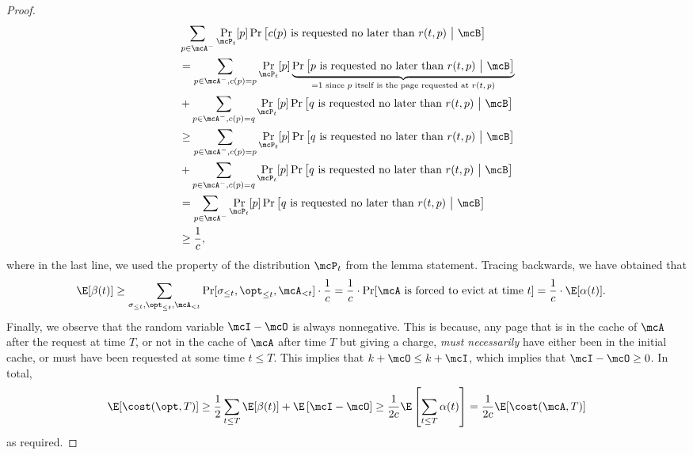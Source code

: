 \begin{proof}
    \begingroup
    \allowdisplaybreaks
    \begin{align*}
        &\sum_{p \in \mcA^-}\Pr_{\mcP_t}[p] \Pr\left[\text{$c(p)$ is requested no later than $r(t,p)$}\ \big|\ \mcB\right] \\
        &= \sum_{p \in \mcA^-, c(p)=p}\Pr_{\mcP_t}[p]\underbrace{ \Pr\left[\text{$p$ is requested no later than $r(t,p)$}\ \big|\ \mcB\right]}_{=1\text{ since $p$ itself is the page requested at $r(t,p)$}} \\
        &+ \sum_{p \in \mcA^-, c(p)=q}\Pr_{\mcP_t}[p] \Pr\left[\text{$q$ is requested no later than $r(t,p)$}\ \big|\ \mcB\right] \\
        &\ge \sum_{p \in \mcA^-, c(p)=p}\Pr_{\mcP_t}[p] \Pr\left[\text{$q$ is requested no later than $r(t,p)$}\ \big|\ \mcB\right] \\
        &+ \sum_{p \in \mcA^-, c(p)=q}\Pr_{\mcP_t}[p] \Pr\left[\text{$q$ is requested no later than $r(t,p)$}\ \big|\ \mcB\right] \\
        &= \sum_{p \in \mcA^-}\Pr_{\mcP_t}[p] \Pr\left[\text{$q$ is requested no later than $r(t,p)$}\ \big|\ \mcB\right] \\
        &\ge \frac{1}{c},
    \end{align*}%
    \endgroup
    where in the last line, we used the property of the distribution $\mcP_t$ from the lemma statement. %
    Tracing backwards, we have obtained that
    \begin{align*}
        \E[\beta(t)] &\ge \sum_{\sigma_{\le t}, \opt_{\le t}, \mcA_{<t}} \Pr[\sigma_{\le t}, \opt_{\le t}, \mcA_{<t}] \cdot \frac{1}{c} = \frac{1}{c}\cdot \Pr[\text{$\mcA$ is forced to evict at time $t$}] = \frac{1}{c} \cdot \E[\alpha(t)].
    \end{align*}
    Finally, we observe that the random variable $\mcI-\mcO$ is always nonnegative. This is because, any page that is in the cache of $\mcA$ after the request at time $T$, or not in the cache of $\mcA$ after time $T$ but giving a charge, \textit{must necessarily} have either been in the initial cache, or must have been requested at some time $t \le T$. This implies that $k+\mcO \le k + \mcI$, which implies that $\mcI-\mcO \ge 0$. In total, 
    \begin{align*}
        \E[\cost(\opt, T)] \ge \frac12\sum_{t \le T}\E[\beta(t)] + \E\left[\mcI - \mcO\right]
        \ge \frac{1}{2c}\E\left[\sum_{t \le T}\alpha(t)\right] = \frac{1}{2c}\E[\cost(\mcA, T)]
    \end{align*}
    as required.    
\end{proof}

